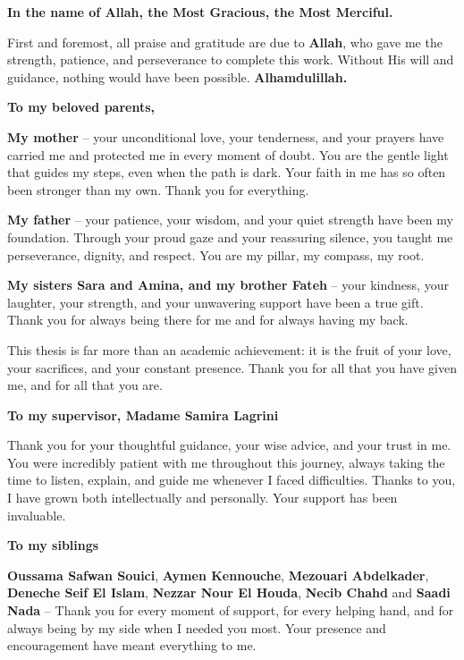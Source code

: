 \documentclass[12pt,a4paper]{report}
\begin{document}
\begin{center}
\textbf{In the name of Allah, the Most Gracious, the Most Merciful.}
\end{center}

First and foremost, all praise and gratitude are due to \textbf{Allah}, who
gave me the strength, patience, and perseverance to complete this work. Without
His will and guidance, nothing would have been possible. \textbf{Alhamdulillah.}

\vspace{0.5cm}

\noindent\textbf{\large To my beloved parents,}

\textbf{My mother} -- your unconditional love, your tenderness, and your
prayers have carried me and protected me in every moment of doubt. You are the
gentle light that guides my steps, even when the path is dark. Your faith in me
has so often been stronger than my own. Thank you for everything.

\textbf{My father} -- your patience, your wisdom, and your quiet strength have
been my foundation. Through your proud gaze and your reassuring silence, you
taught me perseverance, dignity, and respect. You are my pillar, my compass,
my root.

\textbf{My sisters Sara and Amina, and my brother Fateh} -- your kindness, your laughter, your strength, and your unwavering support have been a true gift. Thank you for always being there for me and for always having my back.

This thesis is far more than an academic achievement: it is the fruit of your
love, your sacrifices, and your constant presence. Thank you for all that you
have given me, and for all that you are.

\vspace{0.3cm}

\noindent\textbf{\large To my supervisor, Madame Samira Lagrini}

Thank you for your thoughtful guidance, your wise advice, and your trust in me.
You were incredibly patient with me throughout this journey, always taking the
time to listen, explain, and guide me whenever I faced difficulties.
Thanks to you, I have grown both intellectually and personally. Your support
has been invaluable.

\vspace{0.3cm}

\noindent\textbf{\large To my siblings}

\textbf{Oussama Safwan Souici}, \textbf{Aymen Kennouche}, \textbf{Mezouari Abdelkader}, \textbf{Deneche Seif El Islam},
\textbf{Nezzar Nour El Houda}, \textbf{Necib Chahd} and \textbf{Saadi Nada} --
Thank you for every moment of support, for every helping hand, and for always being by my side when I needed you most. Your presence and encouragement have meant everything to me.
\end{document}
